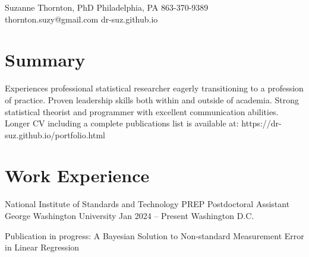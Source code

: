 \documentclass[letterpaper]{resume_config}
\begin{document}
\Header
    {Suzanne Thornton, PhD} %
    {Philadelphia, PA} %
    {863-370-9389} %
    {thornton.suzy@gmail.com} %
    {dr-suz.github.io} %

\section{Summary}
Experiences professional statistical researcher eagerly transitioning to a profession of practice. Proven leadership skills both within and outside of academia. Strong statistical theorist and programmer with excellent communication abilities. Longer CV including a complete publications list is available at: https://dr-suz.github.io/portfolio.html


\section{Work Experience}
\WorkExperience
    {National Institute of Standards and Technology PREP Postdoctoral Assistant} %
    {George Washington University} %
    {Jan 2024 -- Present} %
    {Washington D.C.} %
    {
        \item Publication in progress: A Bayesian Solution to Non-standard Measurement Error in Linear Regression 
    } 
\end{document}
